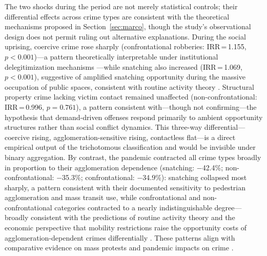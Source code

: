 \documentclass[pdflatex,sn-basic]{sn-jnl}
\begin{document}
The two shocks during the period are not merely statistical controls; their differential effects across crime types are consistent with the theoretical mechanisms proposed in Section~\ref{sec:marco}, though the study's observational design does not permit ruling out alternative explanations. During the social uprising, coercive crime rose sharply (confrontational robberies: IRR\,=\,1.155, $p<0.001$)---a pattern theoretically interpretable under institutional delegitimization mechanisms \citep{tyler2006,rosenfeld2021}---while snatching also increased (IRR\,=\,1.069, $p<0.001$), suggestive of amplified snatching opportunity during the massive occupation of public spaces, consistent with routine activity theory \citep{cohen1979}. Structural property crime lacking victim contact remained unaffected (non-confrontational: IRR\,=\,0.996, $p=0.761$), a pattern consistent with---though not confirming---the hypothesis that demand-driven offenses respond primarily to ambient opportunity structures rather than social conflict dynamics. This three-way differential---coercive rising, agglomeration-sensitive rising, contactless flat---is a direct empirical output of the trichotomous classification and would be invisible under binary aggregation. By contrast, the pandemic contracted all crime types broadly in proportion to their agglomeration dependence (snatching: $-$42.4\%; non-confrontational: $-$35.3\%; confrontational: $-$34.9\%): snatching collapsed most sharply, a pattern consistent with their documented sensitivity to pedestrian agglomeration and mass transit use, while confrontational and non-confrontational categories contracted to a nearly indistinguishable degree---broadly consistent with the predictions of routine activity theory \citep{cohen1979,ashby2020,stickle2020} and the economic perspective that mobility restrictions raise the opportunity costs of agglomeration-dependent crimes differentially \citep{becker1968}. These patterns align with comparative evidence on mass protests \citep{bell2014,mongale2022} and pandemic impacts on crime \citep{ashby2020,stickle2020}.
\end{document}

